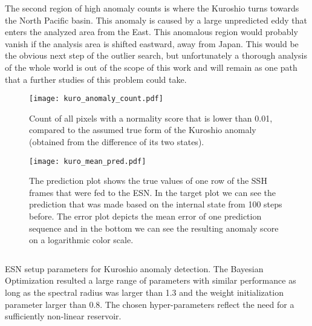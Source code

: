 The second region of high anomaly counts is where the Kuroshio turns towards
the North Pacific basin. This anomaly is caused by a large unpredicted  eddy
that enters the analyzed area from the East. This anomalous region would
probably vanish if the analysis area is shifted eastward, away from Japan.
This would be the obvious next step of the outlier search, but unfortunately a
thorough analysis of the whole world is out of the scope of this work and will
remain as one path that a further studies of this problem could take.
\begin{figure}
  \centering
  \texttt{[image: kuro\_anomaly\_count.pdf]}
  \caption{Count of all pixels with a normality score that is lower than 0.01,
  compared to the assumed true form of the Kuroshio anomaly (obtained from the
  difference of its two states).}
  \label{fig:kuro_anomaly_count}
\end{figure}


\begin{figure}
  \centering
  \texttt{[image: kuro\_mean\_pred.pdf]}
  \caption{The prediction plot shows the true values of one row of the SSH
    frames that were fed to the ESN.  In the target plot we can see the
    prediction that was made based on the internal state from 100 steps before.
    The error plot depicts the mean error of one prediction sequence and in the
    bottom we can see the resulting anomaly score on a logarithmic color scale.
  }
  \label{fig:kuro_mean_pred}
\end{figure}

\begin{listing}
  \inputminted{json}{pseudocode/model_setups/kuro_setup.json}
  \label{lst:kuro_setup}
  \caption{ESN setup parameters for Kuroshio anomaly detection. The Bayesian
  Optimization resulted a large range of parameters with similar performance as
  long as the spectral radius was larger than 1.3 and the weight initialization
  parameter larger than 0.8. The chosen hyper-parameters reflect the need for a
  sufficiently non-linear reservoir.}
\end{listing}
